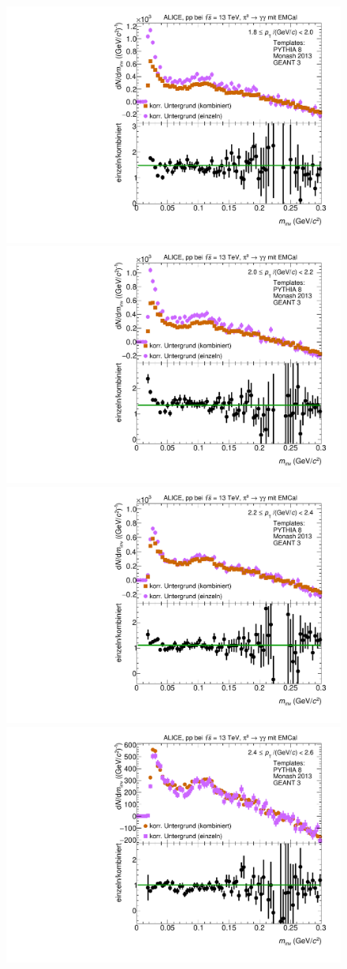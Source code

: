 \begin{figure}[t]
\begin{multicols}{2}
\end{multicols}
\begin{multicols}{2}
    \includegraphics[width=.65\linewidth]{Anhang/BackgroundWithRatio03_Data_2016.pdf}\par
    \includegraphics[width=.65\linewidth]{Anhang/BackgroundWithRatio04_Data_2016.pdf}\par
\end{multicols}
\begin{multicols}{2}
    \includegraphics[width=.65\linewidth]{Anhang/BackgroundWithRatio05_Data_2016.pdf}\par
    \includegraphics[width=.65\linewidth]{Anhang/BackgroundWithRatio06_Data_2016.pdf}\par
\end{multicols}
\end{figure}
\clearpage


